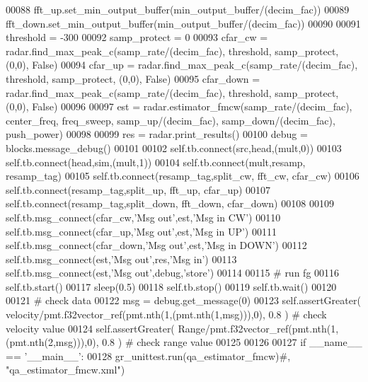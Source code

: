 \begin{DoxyCode}
00088         fft\_up.set\_min\_output\_buffer(min\_output\_buffer/(decim\_fac))
00089         fft\_down.set\_min\_output\_buffer(min\_output\_buffer/(decim\_fac))
00090         
00091         threshold = -300
00092         samp\_protect = 0
00093         cfar\_cw = radar.find\_max\_peak\_c(samp\_rate/(decim\_fac), threshold, samp\_protect, (0,0), \textcolor{keyword}{False})
00094         cfar\_up = radar.find\_max\_peak\_c(samp\_rate/(decim\_fac), threshold, samp\_protect, (0,0), \textcolor{keyword}{False})
00095         cfar\_down = radar.find\_max\_peak\_c(samp\_rate/(decim\_fac), threshold, samp\_protect, (0,0), \textcolor{keyword}{False})
00096         
00097         est = radar.estimator\_fmcw(samp\_rate/(decim\_fac), center\_freq, freq\_sweep, samp\_up/(decim\_fac), 
      samp\_down/(decim\_fac), push\_power)
00098         
00099         res = radar.print\_results()
00100         debug = blocks.message\_debug()
00101         
00102         self.tb.connect(src,head,(mult,0))
00103         self.tb.connect(head,sim,(mult,1))
00104         self.tb.connect(mult,resamp, resamp\_tag)
00105         self.tb.connect(resamp\_tag,split\_cw, fft\_cw, cfar\_cw)
00106         self.tb.connect(resamp\_tag,split\_up, fft\_up, cfar\_up)
00107         self.tb.connect(resamp\_tag,split\_down, fft\_down, cfar\_down)
00108         
00109         self.tb.msg\_connect(cfar\_cw,\textcolor{stringliteral}{'Msg out'},est,\textcolor{stringliteral}{'Msg in CW'})
00110         self.tb.msg\_connect(cfar\_up,\textcolor{stringliteral}{'Msg out'},est,\textcolor{stringliteral}{'Msg in UP'})
00111         self.tb.msg\_connect(cfar\_down,\textcolor{stringliteral}{'Msg out'},est,\textcolor{stringliteral}{'Msg in DOWN'})
00112         self.tb.msg\_connect(est,\textcolor{stringliteral}{'Msg out'},res,\textcolor{stringliteral}{'Msg in'})
00113         self.tb.msg\_connect(est,\textcolor{stringliteral}{'Msg out'},debug,\textcolor{stringliteral}{'store'})
00114         
00115         \textcolor{comment}{# run fg}
00116         self.tb.start()
00117         sleep(0.5)
00118         self.tb.stop()
00119         self.tb.wait()
00120         
00121         \textcolor{comment}{# check data}
00122         msg = debug.get\_message(0)
00123         self.assertGreater( velocity/pmt.f32vector\_ref(pmt.nth(1,(pmt.nth(1,msg))),0), 0.8 ) \textcolor{comment}{# check
       velocity value}
00124         self.assertGreater( Range/pmt.f32vector\_ref(pmt.nth(1,(pmt.nth(2,msg))),0), 0.8 ) \textcolor{comment}{# check range
       value}
00125 
00126 
00127 \textcolor{keywordflow}{if} \_\_name\_\_ == \textcolor{stringliteral}{'\_\_main\_\_'}:
00128     gr\_unittest.run(qa\_estimator\_fmcw)\textcolor{comment}{#, "qa\_estimator\_fmcw.xml")}
\end{DoxyCode}
